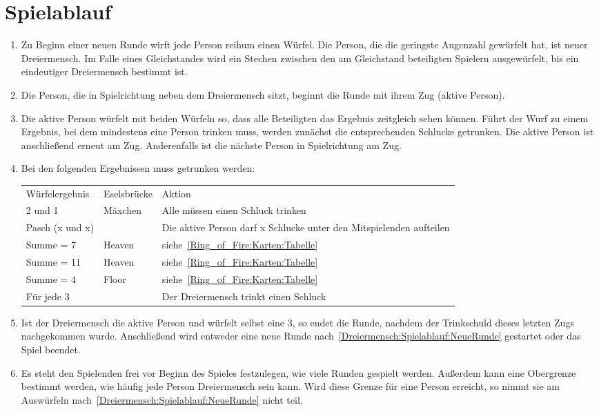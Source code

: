 \section{Spielablauf}
\begin{enumerate}[label={(\arabic*)}]
	\item\label{Dreiermensch:Spielablauf:NeueRunde}
	Zu Beginn einer neuen Runde wirft jede Person reihum einen Würfel.
	Die Person, die die geringste Augenzahl gewürfelt hat, ist neuer Dreiermensch.
	Im Falle eines Gleichstandes wird ein Stechen zwischen den am Gleichstand beteiligten Spielern ausgewürfelt, bis ein eindeutiger Dreiermensch bestimmt ist.
	
	\item
	Die Person, die in Spielrichtung neben dem Dreiermensch sitzt, beginnt die Runde mit ihrem Zug (\glqq{}aktive Person\grqq{}).
	
	\item
	Die aktive Person würfelt mit beiden Würfeln so, dass alle Beteiligten das Ergebnis zeitgleich sehen können.
	Führt der Wurf zu einem Ergebnis, bei dem mindestens eine Person trinken muss, werden zunächst die entsprechenden Schlucke getrunken.
	Die aktive Person ist anschließend erneut am Zug.
	Anderenfalls ist die nächste Person in Spielrichtung am Zug.
	
	\item
	Bei den folgenden Ergebnissen muss getrunken werden:

	\begin{tabulary}{0.92\textwidth}{llL}
		\toprule
		Würfelergebnis   & Eselsbrücke & Aktion \\
		2 und 1          & Mäxchen & Alle müssen einen Schluck trinken \\
		Pasch (x und x)  &         & Die aktive Person darf x Schlucke unter den Mitspielenden aufteilen \\
		Summe = 7        & Heaven  & siehe~\ref{Ring_of_Fire:Karten:Tabelle} \\
		Summe = 11       & Heaven  & siehe~\ref{Ring_of_Fire:Karten:Tabelle} \\
		Summe = 4        & Floor   & siehe~\ref{Ring_of_Fire:Karten:Tabelle} \\
		Für jede 3 &         &Der Dreiermensch trinkt einen Schluck \\\bottomrule
	\end{tabulary}

	\item
	Ist der Dreiermensch die aktive Person und würfelt selbst eine 3, so endet die Runde, nachdem der Trinkschuld dieses letzten Zugs nachgekommen wurde.
	Anschließend wird entweder eine neue Runde nach~\ref{Dreiermensch:Spielablauf:NeueRunde} gestartet oder das Spiel beendet.
	
	\item
	Es steht den Spielenden frei vor Beginn des Spieles festzulegen, wie viele Runden gespielt werden.
	Außerdem kann eine Obergrenze bestimmt werden, wie häufig jede Person Dreiermensch sein kann.
	Wird diese Grenze für eine Person erreicht, so nimmt sie am Auswürfeln nach~\ref{Dreiermensch:Spielablauf:NeueRunde} nicht teil.
\end{enumerate}
